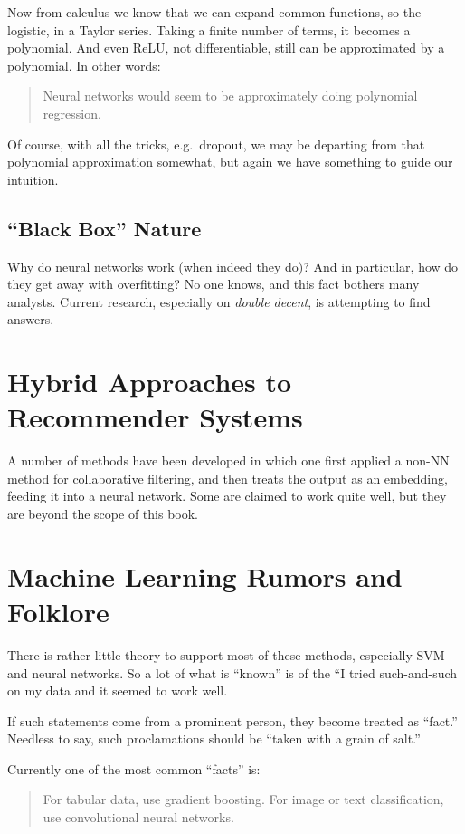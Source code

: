 Now from calculus we know that we can expand common functions, so the
logistic, in a Taylor series.  Taking a finite number of terms, it
becomes a polynomial.  And even ReLU, not differentiable, still can be
approximated by a polynomial.  In other words:

\begin{quote}
Neural networks would seem to be approximately doing polynomial
regression.
\end{quote}

Of course, with all the tricks, e.g.\ dropout, we may be departing from
that polynomial approximation somewhat, but again we have something to
guide our intuition.

\subsection{``Black Box'' Nature}

Why do neural networks work (when indeed they do)?  And in particular,
how do they get away with overfitting?  No one knows, and this fact
bothers many analysts.  Current research, especially on \textit{double
decent}, is attempting to find answers.

\section{Hybrid Approaches to Recommender Systems}

A number of methods have been developed in which one first applied a
non-NN method for collaborative filtering, and then treats the output as
an embedding, feeding it into a neural network.  Some are claimed to
work quite well, but they are beyond the scope of this book.

\section{Machine Learning Rumors and Folklore}

There is rather little theory to support most of these methods,
especially SVM and neural networks.  So a lot of what is ``known'' is of
the ``I tried such-and-such on my data and it seemed to work well.

If such statements come from a prominent person, they become treated as
``fact.''  Needless to say, such proclamations should be ``taken with a
grain of salt.''

Currently one of the most common ``facts'' is:

\begin{quote}

For tabular data, use gradient boosting.  For image or text
classification, use convolutional neural networks.

\end{quote}

